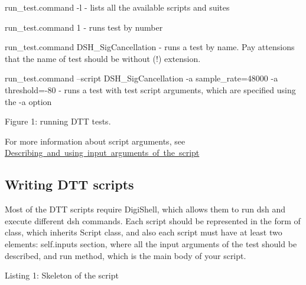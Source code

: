 \begin{DoxyItemize}
\item {\ttfamily run\+\_\+test.\+command -\/l} -\/ lists all the available scripts and suites 
\item {\ttfamily run\+\_\+test.\+command 1} -\/ runs test by number 
\item {\ttfamily run\+\_\+test.\+command D\+S\+H\+\_\+\+Sig\+Cancellation} -\/ runs a test by name. Pay attensions that the name of test should be without (!) extension. 
\item {\ttfamily run\+\_\+test.\+command --script D\+S\+H\+\_\+\+Sig\+Cancellation -\/a sample\+\_\+rate=48000 -\/a threshold=-\/80} -\/ runs a test with test script arguments, which are specified using the {\ttfamily -\/a} option 
\end{DoxyItemize}

 Figure 1\+: running D\+TT tests.

For more information about script arguments, see \mbox{\hyperlink{a00836_describing_and_using_input_arguments_of_the_script}{Describing and using input arguments of the script}}



 \hypertarget{a00836_dtt_guide_03_writing_dtt_scripts}{}\subsection{Writing D\+T\+T scripts}\label{a00836_dtt_guide_03_writing_dtt_scripts}
 Most of the D\+TT scripts require {\ttfamily Digi\+Shell}, which allows them to run dsh and execute different dsh commands. Each script should be represented in the form of class, which inherits Script class, and also each script must have at least two elements\+: self.\+inputs section, where all the input arguments of the test should be described, and run method, which is the main body of your script.


\begin{DoxyCode}{0}
\DoxyCodeLine{}
\DoxyCodeLine{}
\end{DoxyCode}
 Listing 1\+: Skeleton of the script

